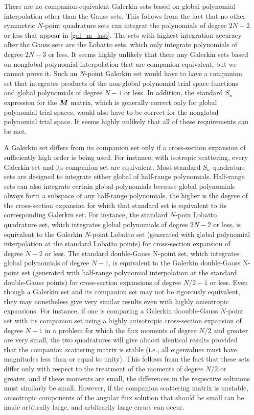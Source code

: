 There are no companion-equivalent Galerkin sets based on global polynomial
interpolation other than the Gauss sets. This follows from the fact that no
other symmetric $N$-point quadrature sets can integrat the polynomials of
degree $2N-2$ or less that appear in \cref{gal_m_last}. The sets with highest
integration accuracy after the Gauss sets are the Lobatto sets, which only
integrate polynomials of degree $2N-3$ or less. It seems highly unlikely that
there any Galerkin sets based on nonglobal polynomial interpolation that are
companion-equivalent, but we cannot prove it. Such an $N$-point Galerkin set
would have to have a companion set that integrates products of the non-global
polynomial trial space functions and global polynomials of degree $N-1$ or
less. In addition, the standard $S_n$ expression for the $\boldsymbol{M}$ matrix,
which is generally correct only for global polynomial trial spaces, would also
have to be correct for the nonglobal polynomial trial space. It seems highly
unlikely that all of these requirements can be met.

A Galerkin set differs from its companion set only if a cross-section
expansion of sufficiently high order is being used. For instance, with
isotropic scattering, every Galerkin set and its companion set are equivalent.
Most standard $S_n$ quadrature sets are designed to integrate either global of
half-range polynomials. Half-range sets can also integrate certain global
polynomials because global polynomials always form a subspace of any
half-range polynomials, the higher is the degree of the cross-section
expansion for which that standard set is equivalent to its corresponding
Galerkin set. For instance, the standard $N$-poin Lobatto quadrature set,
which integrates global polynomials of degree $2N-2$ or less, is equivalent to
the Galerkin $N$-point Lobatto set (generated with global polynomial
interpolation at the standard Lobatto points) for cross-section expansion of
degree $N-2$ or less. The standard double-Gauss N-point set, which integrates
global polynomials of degree $N-1$, is equivalent to the Galerkin double-Gauss
N-point set (generated with half-range polynomial interpolation at the
standard double-Gauss points) for cross-section expansions of degree $N/2-1$
or less. Even though a Galerkin set and its companion set may not be
rigorously equivalent, they may nonetheless give very similar results even
with highly anisotropic expansions. For instance, if one is comparing a
Galerkin doouble-Gauss $N$-point set with its companion set using a highly
anisotropic cross-section expansion of degree $N-1$ in a problem for which the
flux moments of degree $N/2$ and greater are very small, the two quadratures
will give almost identical results provided that the companion scattering
matrix is stable (i.e., all eigenvalues must have magnitudes less than or
equal to unity). This follows from the fact that these sets differ only with
respect to the treatment of the moments of degree $N/2$ or greater, and if
these moments are small, the differences in the respective soltuions must
similarly be small. However, if the companion scattering matrix is unstable,
anisotropic components of the angular flux solution that should be small can
be made arbitraily large, and arbitrarily large errors can occur.

